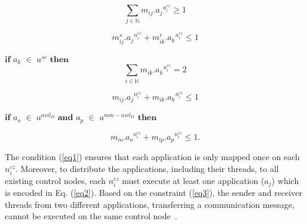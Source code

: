     
    \begin{equation}
    	\sum_{j \in \mathbb{N}} {m_{ij}}.{a_j}^{n_{i}^{cz}} \geq{1}
    	\label{eq2}
    \end{equation}	
    	
    \begin{equation}
    	 {m_{ij}^{s}}.{a_j}^{n_{i}^{cz}} + {m_{ik}^{r}}.{a_{k}}^{n_{i}^{cz}}\leq{1}
    	\label{eq3}
    \end{equation}	
    
    
    $\textbf{if}$ $a_k$ $\in$ $a^{sc}$ $\textbf{then}$\newline	
    \begin{equation}	
    	\sum_{i \in \mathbb{N} } {m_{ik}}.{a_{k}}^{n_{i}^{cz}} =2
    	\label{eq4}
    \end{equation}
    	
    \begin{equation}
    	{m_{ij}}.{a_j}^{n_{i}^{cz}} + {m_{ik}}.{a_{k}}^{n_{i}^{cz}}\leq{1}
    	\label{eq5}
    \end{equation}		
    \vspace{1pt}
    
    $\textbf{if}$ $a_o$ $\in$ $a^{asil_D}$ $\textbf{and}$ $a_p$ $\in$ $a^{non-asil_D}$ $\textbf{then}$\newline	
    
    \begin{equation}
    	{m_{io}}.{a_o}^{n_{i}^{cz}} + {m_{ip}}.{a_{p}}^{n_{i}^{cz}}\leq{1}.
    	\label{eqffi6}
    \end{equation}
    
    
    The condition (\ref{eq1}) ensures that each application is only mapped once on each ${n_{i}^{cz}}$. Moreover, to distribute the applications, including their threads, to all existing control nodes, 
    each ${n_{i}^{cz}}$ must execute at least one application ($a_j$) which is encoded in Eq. (\ref{eq2}). Based on the constraint (\ref{eq3}), the sender and receiver threads from two different applications, transferring a communication message, cannot be executed on the same control node~\cite{askaripoor2023designer}. 
